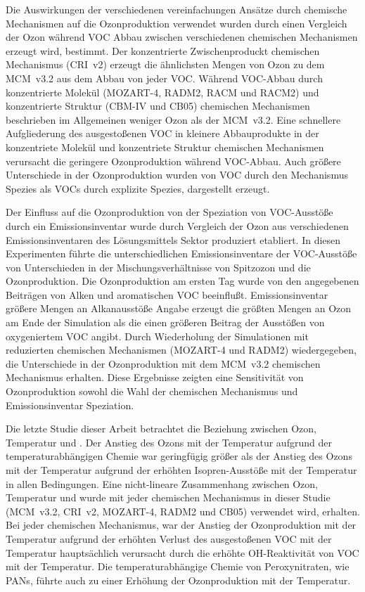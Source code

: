 Die Auswirkungen der verschiedenen vereinfachungen Ansätze durch chemische Mechanismen auf die Ozonproduktion verwendet wurden durch einen Vergleich der Ozon während VOC Abbau zwischen verschiedenen chemischen Mechanismen erzeugt wird, bestimmt.
Der konzentrierte Zwischenproduckt chemischen Mechanismus (CRI~v2) erzeugt die ähnlichsten Mengen von Ozon zu dem MCM~v3.2 aus dem Abbau von jeder VOC.
Während VOC-Abbau durch konzentrierte Molekül (MOZART-4, RADM2, RACM und RACM2) und konzentrierte Struktur (CBM-IV und CB05) chemischen Mechanismen beschrieben im Allgemeinen weniger Ozon als der MCM~v3.2.
Eine schnellere Aufgliederung des ausgestoßenen VOC in kleinere Abbauprodukte in der konzentriete Molekül und konzentriete Struktur chemischen Mechanismen verursacht die geringere Ozonproduktion während VOC-Abbau.
Auch größere Unterschiede in der Ozonproduktion wurden von VOC durch den Mechanismus Spezies als VOCs durch explizite Spezies, dargestellt erzeugt.

Der Einfluss auf die Ozonproduktion von der Speziation von VOC-Ausstöße durch ein Emissionsinventar wurde durch Vergleich der Ozon aus verschiedenen Emissionsinventaren des Lösungsmittels Sektor produziert etabliert.
In diesen Experimenten führte die unterschiedlichen Emissionsinventare der VOC-Ausstöße von Unterschieden in der Mischungsverhältnisse von Spitzozon und die Ozonproduktion.
Die Ozonproduktion am ersten Tag wurde von den angegebenen Beiträgen von Alken und aromatischen VOC beeinflußt.
Emissionsinventar größere Mengen an Alkanausstöße Angabe erzeugt die größten Mengen an Ozon am Ende der Simulation als die einen größeren Beitrag der Ausstößen von oxygeniertem VOC angibt.
Durch Wiederholung der Simulationen mit reduzierten chemischen Mechanismen (MOZART-4 und RADM2) wiedergegeben, die Unterschiede in der Ozonproduktion mit dem MCM~v3.2 chemischen Mechanismus erhalten.
Diese Ergebnisse zeigten eine Sensitivität von Ozonproduktion sowohl die Wahl der chemischen Mechanismus und Emissionsinventar Speziation.

Die letzte Studie dieser Arbeit betrachtet die Beziehung zwischen Ozon, Temperatur und .
Der Anstieg des Ozons mit der Temperatur aufgrund der temperaturabhängigen Chemie war geringfügig größer als der Anstieg des Ozons mit der Temperatur aufgrund der erhöhten Isopren-Ausstöße mit der Temperatur in allen  Bedingungen.
Eine nicht-lineare Zusammenhang zwischen Ozon, Temperatur und  wurde mit jeder chemischen Mechanismus in dieser Studie (MCM~v3.2, CRI~v2, MOZART-4, RADM2 und CB05) verwendet wird, erhalten.
Bei jeder chemischen Mechanismus, war der Anstieg der Ozonproduktion mit der Temperatur aufgrund der erhöhten Verlust des ausgestoßenen VOC mit der Temperatur hauptsächlich verursacht durch die erhöhte OH-Reaktivität von VOC mit der Temperatur.
Die temperaturabhängige Chemie von Peroxynitraten, wie PANs, führte auch zu einer Erhöhung der Ozonproduktion mit der Temperatur.

